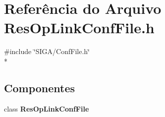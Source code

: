 \section{Referência do Arquivo Res\+Op\+Link\+Conf\+File.\+h}
\label{_res_op_link_conf_file_8h}
{\ttfamily \#include \char`\"{}S\+I\+G\+A/\+Conf\+File.\+h\char`\"{}}\\*
\subsection*{Componentes}
\begin{DoxyCompactItemize}
\item 
class {\bf Res\+Op\+Link\+Conf\+File}
\end{DoxyCompactItemize}
